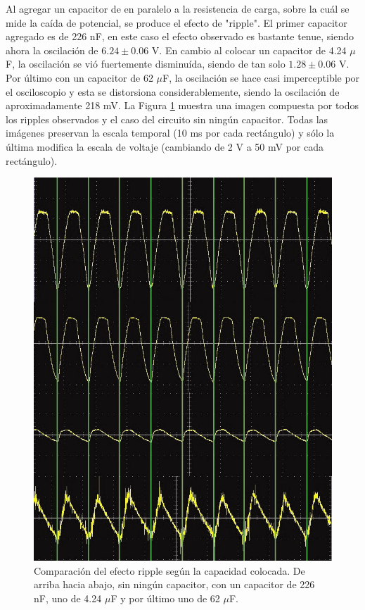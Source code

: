 \documentclass[twoside,twocolumn,a4paper]{article}
\begin{document}
Al agregar un capacitor de en paralelo a la resistencia de carga, sobre la cu\'al se mide la ca\'ida de potencial, se produce el efecto de "ripple". El primer capacitor agregado es de 226 nF, en este caso el efecto observado es bastante tenue, siendo ahora la oscilaci\'on de $6.24\pm0.06$ V. En cambio al colocar un capacitor de 4.24 $\mu$F, la oscilaci\'on se vi\'o fuertemente disminu\'ida, siendo de tan solo $1.28\pm0.06$ V. Por \'ultimo con un capacitor de 62 $\mu$F, la oscilaci\'on se hace casi imperceptible por el osciloscopio y esta se distorsiona considerablemente, siendo la oscilaci\'on de aproximadamente 218 mV. La Figura \ref{fig:ripplejunto} muestra una imagen compuesta por todos los ripples observados y el caso del circuito sin ning\'un capacitor. Todas las im\'agenes preservan la escala temporal (10 ms por cada rect\'angulo) y s\'olo la \'ultima modifica la escala de voltaje (cambiando de 2 V a 50 mV por cada rect\'angulo).

\begin{figure}[h]
\includegraphics[width=\linewidth]{ripplejunto.jpg}
\captionsetup{justification=centering}
\caption{Comparaci\'on del efecto ripple seg\'un la capacidad colocada. De arriba hacia abajo, sin ning\'un capacitor, con un capacitor de 226 nF, uno de 4.24 $\mu$F y por \'ultimo uno de 62 $\mu$F.}
\label{fig:ripplejunto}
\end{figure} 
\end{document}
